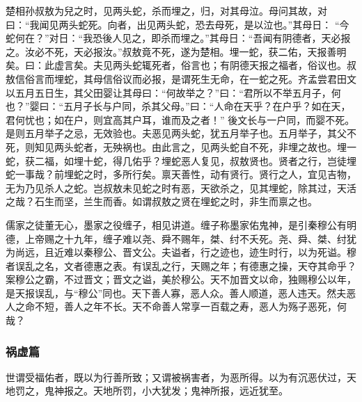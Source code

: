 \documentclass[]{article}
\begin{document}
楚相孙叔敖为兒之时，见两头蛇，杀而埋之，归，对其母泣。母问其故，对曰：``我闻见两头蛇死。向者，出见两头蛇，恐去母死，是以泣也。''其母日：
``今蛇何在？''对日：``我恐後人见之，即杀而埋之。''其母日：``吾闻有阴德者，天必报之。汝必不死，天必报汝。''叔敖竟不死，遂为楚相。埋一蛇，获二佑，天报善明矣。曰：此虚言矣。夫见两头蛇辄死者，俗言也；有阴德天报之福者，俗议也。叔敖信俗言而埋蛇，其母信俗议而必报，是谓死生无命，在一蛇之死。齐孟尝君田文以五月五日生，其父田婴让其母曰：``何故举之？''曰：``君所以不举五月子，何也？''婴曰：``五月子长与户同，杀其父母。''曰：``人命在天乎？在户乎？如在天，君何忧也；如在户，则宜高其户耳，谁而及之者！''
後文长与一户同，而婴不死。是则五月举子之忌，无效验也。夫恶见两头蛇，犹五月举子也。五月举子，其父不死，则知见两头蛇者，无殃祸也。由此言之，见两头蛇自不死，非埋之故也。埋一蛇，获二福，如埋十蛇，得几佑乎？埋蛇恶人复见，叔敖贤也。贤者之行，岂徒埋蛇一事哉？前埋蛇之时，多所行矣。禀天善性，动有贤行。贤行之人，宜见吉物，无为乃见杀人之蛇。岂叔敖未见蛇之时有恶，天欲杀之，见其埋蛇，除其过，天活之哉？石生而坚，兰生而香。如谓叔敖之贤在埋蛇之时，非生而禀之也。

儒家之徒董无心，墨家之役缠子，相见讲道。缠子称墨家佑鬼神，是引秦穆公有明德，上帝赐之十九年，缠子难以尧、舜不赐年，桀、纣不夭死。尧、舜、桀、纣犹为尚远，且近难以秦穆公、晋文公。夫谥者，行之迹也，迹生时行，以为死谥。穆者误乱之名，文者德惠之表。有误乱之行，天赐之年；有德惠之操，天夺其命乎？案穆公之霸，不过晋文；晋文之谥，美於穆公。天不加晋文以命，独赐穆公以年，是天报误乱，与``穆公''同也。天下善人寡，恶人众。善人顺道，恶人违天。然夫恶人之命不短，善人之年不长。天不命善人常享一百载之寿，恶人为殇子恶死，何哉？

\hypertarget{header-n218}{%
\subsubsection{祸虚篇}\label{header-n218}}

世谓受福佑者，既以为行善所致；又谓被祸害者，为恶所得。以为有沉恶伏过，天地罚之，鬼神报之。天地所罚，小大犹发；鬼神所报，远近犹至。
\end{document}
